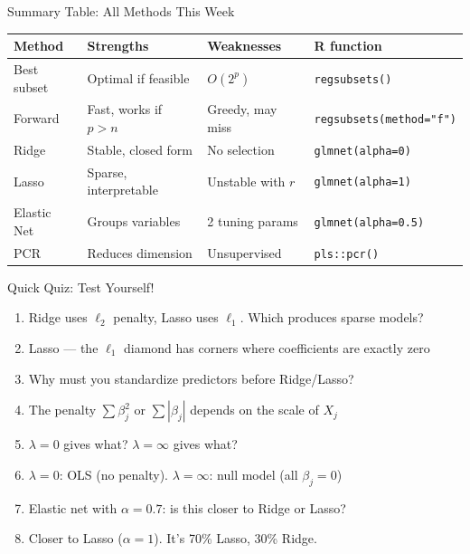 \documentclass[aspectratio=169, 11pt]{beamer}
\begin{document}
\begin{frame}{Summary Table: All Methods This Week}
\begin{center}
\footnotesize
\begin{tabular}{lp{3cm}p{3cm}l}
\toprule
Method & Strengths & Weaknesses & R function \\
\midrule
Best subset & Optimal if feasible & $O(2^p)$ & \texttt{regsubsets()} \\
Forward & Fast, works if $p>n$ & Greedy, may miss & \texttt{regsubsets(method="f")} \\
Ridge & Stable, closed form & No selection & \texttt{glmnet(alpha=0)} \\
Lasso & Sparse, interpretable & Unstable with $r$ & \texttt{glmnet(alpha=1)} \\
Elastic Net & Groups variables & 2 tuning params & \texttt{glmnet(alpha=0.5)} \\
PCR & Reduces dimension & Unsupervised & \texttt{pls::pcr()} \\
\bottomrule
\end{tabular}
\normalsize
\end{center}
\end{frame}


\begin{frame}{Quick Quiz: Test Yourself!}
\begin{enumerate}
  \item Ridge uses $\ell_2$ penalty, Lasso uses $\ell_1$. Which produces sparse models?
  \pause
  \item[]{\textcolor{muted}{\footnotesize Lasso --- the $\ell_1$ diamond has corners where coefficients are exactly zero}}
  \vspace{0.3em}
  \item Why must you standardize predictors before Ridge/Lasso?
  \pause
  \item[]{\textcolor{muted}{\footnotesize The penalty $\sum\beta_j^2$ or $\sum|\beta_j|$ depends on the scale of $X_j$}}
  \vspace{0.3em}
  \item $\lambda = 0$ gives what? $\lambda = \infty$ gives what?
  \pause
  \item[]{\textcolor{muted}{\footnotesize $\lambda=0$: OLS (no penalty). $\lambda=\infty$: null model (all $\beta_j = 0$)}}
  \vspace{0.3em}
  \item Elastic net with $\alpha = 0.7$: is this closer to Ridge or Lasso?
  \pause
  \item[]{\textcolor{muted}{\footnotesize Closer to Lasso ($\alpha=1$). It's 70\% Lasso, 30\% Ridge.}}
\end{enumerate}
\end{frame}
\end{document}
